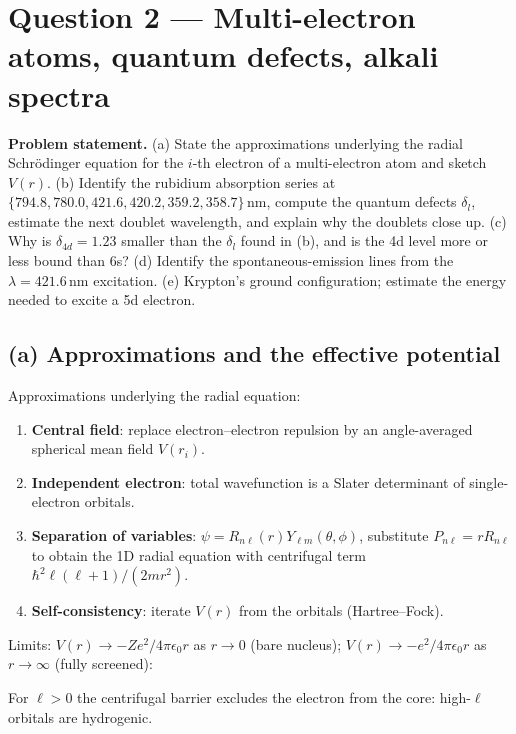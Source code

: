 \documentclass[11pt]{article}
\begin{document}
\section*{Question 2 --- Multi-electron atoms, quantum defects, alkali spectra}

\textbf{Problem statement.} (a) State the approximations underlying the radial Schr\"odinger equation for the $i$-th electron of a multi-electron atom and sketch $V(r)$. (b) Identify the rubidium absorption series at $\{794.8, 780.0, 421.6, 420.2, 359.2, 358.7\}\,\mathrm{nm}$, compute the quantum defects $\delta_{l}$, estimate the next doublet wavelength, and explain why the doublets close up. (c) Why is $\delta_{4d}=1.23$ smaller than the $\delta_{l}$ found in (b), and is the 4d level more or less bound than 6s? (d) Identify the spontaneous-emission lines from the $\lambda=421.6\,\mathrm{nm}$ excitation. (e) Krypton's ground configuration; estimate the energy needed to excite a 5d electron.

\subsection*{(a) Approximations and the effective potential}

Approximations underlying the radial equation:
\begin{enumerate}
\item \textbf{Central field}: replace electron--electron repulsion by an angle-averaged spherical mean field $V(r_{i})$.
\item \textbf{Independent electron}: total wavefunction is a Slater determinant of single-electron orbitals.
\item \textbf{Separation of variables}: $\psi=R_{n\ell}(r)Y_{\ell m}(\theta,\phi)$, substitute $P_{n\ell}=rR_{n\ell}$ to obtain the 1D radial equation with centrifugal term $\hbar^{2}\ell(\ell+1)/(2mr^{2})$.
\item \textbf{Self-consistency}: iterate $V(r)$ from the orbitals (Hartree--Fock).
\end{enumerate}

Limits: $V(r)\to-Ze^{2}/4\pi\epsilon_{0}r$ as $r\to 0$ (bare nucleus); $V(r)\to-e^{2}/4\pi\epsilon_{0}r$ as $r\to\infty$ (fully screened):
\begin{center}
\end{center}
For $\ell>0$ the centrifugal barrier excludes the electron from the core: high-$\ell$ orbitals are hydrogenic.
\end{document}
